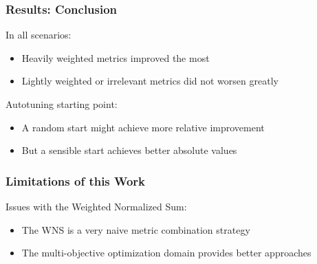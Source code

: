 \documentclass[10pt, compress, xcolor={table,xcdraw,usenames}, aspectratio=169]{beamer}
\begin{document}
\begin{frame}
    \frametitle{Results: Conclusion}
    \begin{block}{In all scenarios:}
        \begin{itemize}
            \item Heavily weighted metrics \alert{improved the most}
            \item Lightly weighted or irrelevant metrics \alert{did not worsen
                greatly}
        \end{itemize}
    \end{block}

    \pause

    \begin{block}{Autotuning starting point:}
        \begin{itemize}
            \item A random start \alert{might achieve more relative
                improvement}
            \item But a sensible start \alert{achieves better absolute values}
        \end{itemize}
    \end{block}
\end{frame}

\begin{frame}
    \frametitle{Limitations of this Work}
    \begin{block}{Issues with the \alert{Weighted Normalized Sum}:}
        \begin{itemize}
            \item The WNS is a \alert{very naive metric combination strategy}
            \item The \alert{multi-objective optimization} domain provides
                \alert{better approaches}
        \end{itemize}
    \end{block}
\end{frame}
\end{document}
